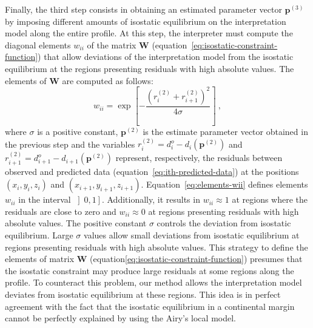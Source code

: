 \documentclass[manuscript]{geophysics}
\begin{document}
Finally, the third step consists in obtaining an estimated parameter vector $\mathbf{p}^{(3)}$
by imposing different amounts of isostatic equilibrium on the interpretation model along the
entire profile. At this step, the interpreter must compute the diagonal elements 
$w_{ii}$ of the matrix $\mathbf{W}$
(equation~\ref{eq:isostatic-constraint-function}) that allow deviations 
of the interpretation model from the isostatic equilibrium at the regions presenting 
residuals with high absolute values. The elements of $\mathbf{W}$ are computed as follows:
\begin{equation} \label{eq:elements-wii}
w_{ii} = 
\exp \left[ - \frac{ \left( r_{i}^{(2)} + r_{i+1}^{(2)} \right)^{2}}{4 \sigma} \right] \: ,
\end{equation}
where $\sigma$ is a positive constant, $\mathbf{p}^{(2)}$ is the estimate parameter vector
obtained in the previous step and the variables
$r_{i}^{(2)} = d^{o}_{i} - d_{i} \left( \mathbf{p}^{(2)} \right)$ and 
$r_{i+1}^{(2)} = d^{o}_{i+1} - d_{i+1} \left(\mathbf{p}^{(2)} \right)$ represent,
respectively, the residuals between observed and predicted data
(equation~\ref{eq:ith-predicted-data}) at the positions $(x_{i}, y_{i}, z_{i})$ and 
$(x_{i+1}, y_{i+1}, z_{i+1})$. Equation~\ref{eq:elements-wii} defines elements 
$w_{ii}$ in the interval $\left] 0, 1 \right]$. Additionally, it results in 
$w_{ii} \approx 1$ at regions where the residuals are close to zero and 
$w_{ii} \approx 0$ at regions presenting residuals with high absolute values.
The positive constant $\sigma$ controls the deviation from isostatic equilibrium.
Large $\sigma$ values allow small deviations from isostatic equilibrium at
regions presenting residuals with high absolute values.
This strategy to define the elements of matrix $\mathbf{W}$ 
(equation\ref{eq:isostatic-constraint-function}) presumes that the isostatic constraint may
produce large residuals at some regions along the profile. To counteract this problem,
our method allows the interpretation model deviates from isostatic equilibrium at these 
regions. This idea is in perfect agreement with the fact that the isostatic equilibrium
in a continental margin cannot be perfectly explained by using the Airy's local model.
\end{document}
